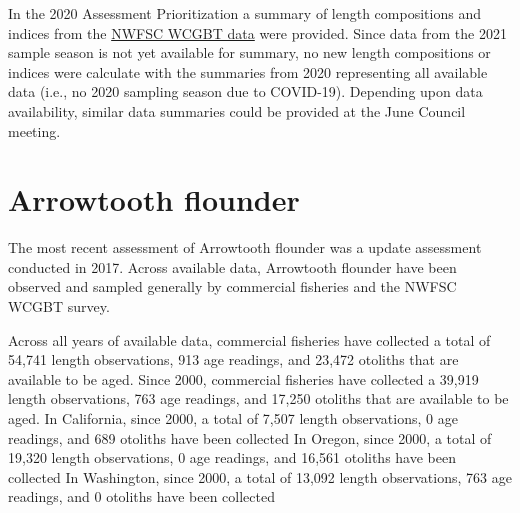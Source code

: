 \documentclass[11pt,
  english,
  letterpaper,
]{article}
\begin{document}
\leavevmode\tagmcend\tagstructend\par


In the 2020 Assessment Prioritization a summary of length compositions and indices from the {\href{https://www.pcouncil.org/documents/2020/05/f-2-attachment-1-summary-of-the-nwfsc-west-coast-groundfish-bottom-trawl-survey-data-for-select-species-from-2003-2019.pdf/}{NWFSC WCGBT data}\leavevmode\tagmcend\tagstructend} were provided. Since data from the 2021 sample season is not yet available for summary, no new length compositions or indices were calculate with the summaries from 2020 representing all available data (i.e., no 2020 sampling season due to COVID-19). Depending upon data availability, similar data summaries could be provided at the June Council meeting.

\leavevmode\tagmcend\tagstructend\par

\newpage


\hypertarget{arrowtooth-flounder}{%
\section{Arrowtooth flounder}\label{arrowtooth-flounder}}

\leavevmode\tagmcend\tagstructend


The most recent assessment of Arrowtooth flounder was a update assessment conducted in 2017. Across available data, Arrowtooth flounder have been observed and sampled generally by commercial fisheries and the NWFSC WCGBT survey.

\leavevmode\tagmcend\tagstructend\par


Across all years of available data, commercial fisheries have collected a total of 54,741 length observations, 913 age readings, and 23,472 otoliths that are available to be aged. Since 2000, commercial fisheries have collected a 39,919 length observations, 763 age readings, and 17,250 otoliths that are available to be aged. In California, since 2000, a total of 7,507 length observations, 0 age readings, and 689 otoliths have been collected In Oregon, since 2000, a total of 19,320 length observations, 0 age readings, and 16,561 otoliths have been collected In Washington, since 2000, a total of 13,092 length observations, 763 age readings, and 0 otoliths have been collected
\end{document}
